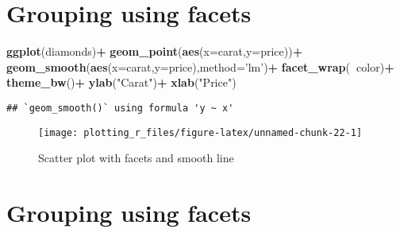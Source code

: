 \documentclass[
]{book}
\newenvironment{Shaded}{\begin{snugshade}}{\end{snugshade}}
\newcommand{\DataTypeTok}[1]{\textcolor[rgb]{0.13,0.29,0.53}{#1}}
\newcommand{\KeywordTok}[1]{\textcolor[rgb]{0.13,0.29,0.53}{\textbf{#1}}}
\newcommand{\NormalTok}[1]{#1}
\newcommand{\OperatorTok}[1]{\textcolor[rgb]{0.81,0.36,0.00}{\textbf{#1}}}
\newcommand{\StringTok}[1]{\textcolor[rgb]{0.31,0.60,0.02}{#1}}
\begin{document}
\hypertarget{grouping-using-facets}{%
\section{Grouping using facets}\label{grouping-using-facets}}

\begin{Shaded}
\begin{Highlighting}[]
         \KeywordTok{ggplot}\NormalTok{(diamonds)}\OperatorTok{+}
\StringTok{          }\KeywordTok{geom_point}\NormalTok{(}\KeywordTok{aes}\NormalTok{(}\DataTypeTok{x=}\NormalTok{carat,}\DataTypeTok{y=}\NormalTok{price))}\OperatorTok{+}
\StringTok{  }\KeywordTok{geom_smooth}\NormalTok{(}\KeywordTok{aes}\NormalTok{(}\DataTypeTok{x=}\NormalTok{carat,}\DataTypeTok{y=}\NormalTok{price),}\DataTypeTok{method=}\StringTok{'lm'}\NormalTok{)}\OperatorTok{+}
\StringTok{  }\KeywordTok{facet_wrap}\NormalTok{(}\OperatorTok{~}\NormalTok{color)}\OperatorTok{+}
\StringTok{  }\KeywordTok{theme_bw}\NormalTok{()}\OperatorTok{+}
\StringTok{  }\KeywordTok{ylab}\NormalTok{(}\StringTok{"Carat"}\NormalTok{)}\OperatorTok{+}\StringTok{ }\KeywordTok{xlab}\NormalTok{(}\StringTok{"Price"}\NormalTok{)}
\end{Highlighting}
\end{Shaded}

\begin{verbatim}
## `geom_smooth()` using formula 'y ~ x'
\end{verbatim}

\begin{figure}

{\centering \texttt{[image: plotting\_r\_files/figure-latex/unnamed-chunk-22-1]} 

}

\caption{Scatter plot with facets and smooth line}\label{fig:unnamed-chunk-22}
\end{figure}

\hypertarget{grouping-using-facets-1}{%
\section{Grouping using facets}\label{grouping-using-facets-1}}

\begin{Shaded}
\end{Shaded}
\end{document}
